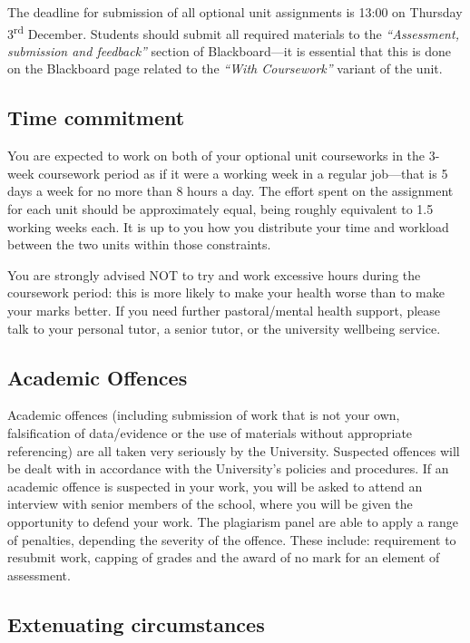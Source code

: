 \documentclass{article}
\newcommand\duedate[0]{Thursday 3\textsuperscript{rd} December}
\begin{document}
The deadline for submission of all optional unit assignments is 13:00 on
\duedate{}. Students should submit all
required materials to the \emph{``Assessment, submission and feedback''}
section of Blackboard---it is essential that this is done on the
Blackboard page related to the \emph{``With Coursework''} variant of the unit.

\subsection*{Time commitment}

You are expected to work on both of your optional unit courseworks in
the 3-week coursework period as if it were a working week in a regular
job---that is 5 days a week for no more than 8 hours a day. The effort
spent on the assignment for each unit should be approximately equal,
being roughly equivalent to 1.5 working weeks each. It is up to you how
you distribute your time and workload between the two units within those
constraints.

You are strongly advised NOT to try and work excessive hours during the
coursework period: this is more likely to make your health worse than to
make your marks better. If you need further pastoral/mental health
support, please talk to your personal tutor, a senior tutor, or the
university wellbeing service.

\subsection*{Academic Offences}

Academic offences (including submission of work that is not your own,
falsification of data/evidence or the use of materials without
appropriate referencing) are all taken very seriously by the University.
Suspected offences will be dealt with in accordance with the
University's policies and procedures. If an academic offence is
suspected in your work, you will be asked to attend an interview with
senior members of the school, where you will be given the opportunity to
defend your work. The plagiarism panel are able to apply a range of
penalties, depending the severity of the offence. These include:
requirement to resubmit work, capping of grades and the award of no mark
for an element of assessment.

\subsection*{Extenuating circumstances}
\end{document}
